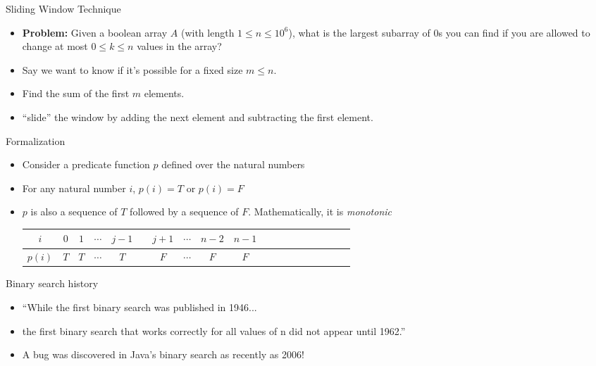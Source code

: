 \documentclass[t]{beamer}
\begin{document}
\begin{frame}{Sliding Window Technique}
\begin{itemize}
    \item \textbf{Problem:} Given a boolean array $A$ (with length $1 \leq n \leq 10^6$), what is the largest subarray of $0$s you can find if you are allowed to change at most $0 \leq k \leq n$ values in the array?
    \pause
    \item Say we want to know if
    it's possible for a fixed size $m \leq n$.
    \pause
    \item Find the sum of the first $m$ elements.
    \pause
    \item ``slide'' the window by adding
    the next element and subtracting
    the first element.
\end{itemize}
\end{frame}

\begin{frame}{Formalization}
\begin{itemize}
    \item Consider a predicate function $p$ defined over the natural numbers
    \item For any natural number $i$, $p(i) = T$ or $p(i) = F$
        
    \pause
        
    \item $p$ is also a sequence of $T$ followed by a sequence of $F$. Mathematically, it is \emph{monotonic}
        
    \pause 
    
    \begin{center}
        \begin{tabular}{ccccccccccccccccccc}
            $i$ & $0$ & $1$ & $\cdots$ & $j-1$ & \color{red}{$j$} & $j+1$ &     $\cdots$ & $n-2$ & $n-1$ \\
            \hline
            $p(i)$ & $T$ & $T$ & $\cdots$ & $T$ & \color{red}{$T$} & $F$ & $\cdots$ & $F$ & $F$ \\
        \end{tabular}
    \end{center}
\end{itemize}
\end{frame}

\begin{frame}{Binary search history}
\begin{itemize}

\item ``While the first binary search was published in 1946...

\pause

\item the first binary search that works correctly for all values of n did not appear until 1962.''

\pause

\item A bug was discovered in Java's binary search as recently as 2006!
\end{itemize}
\end{frame}
\end{document}
